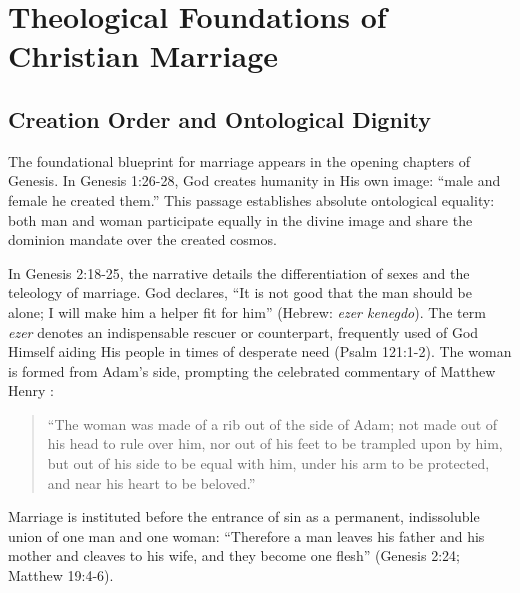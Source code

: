 \documentclass[11pt,twocolumn]{article}
\begin{document}
\section{Theological Foundations of Christian Marriage}

\subsection{Creation Order and Ontological Dignity}
The foundational blueprint for marriage appears in the opening chapters of Genesis. In Genesis 1:26-28, God creates humanity in His own image: ``male and female he created them.'' This passage establishes absolute ontological equality: both man and woman participate equally in the divine image and share the dominion mandate over the created cosmos.

In Genesis 2:18-25, the narrative details the differentiation of sexes and the teleology of marriage. God declares, ``It is not good that the man should be alone; I will make him a helper fit for him'' (Hebrew: \textit{ezer kenegdo}). The term \textit{ezer} denotes an indispensable rescuer or counterpart, frequently used of God Himself aiding His people in times of desperate need (Psalm 121:1-2). The woman is formed from Adam's side, prompting the celebrated commentary of Matthew Henry \cite{henry}:
\begin{quote}
``The woman was made of a rib out of the side of Adam; not made out of his head to rule over him, nor out of his feet to be trampled upon by him, but out of his side to be equal with him, under his arm to be protected, and near his heart to be beloved.''
\end{quote}
Marriage is instituted before the entrance of sin as a permanent, indissoluble union of one man and one woman: ``Therefore a man leaves his father and his mother and cleaves to his wife, and they become one flesh'' (Genesis 2:24; Matthew 19:4-6).
\end{document}
